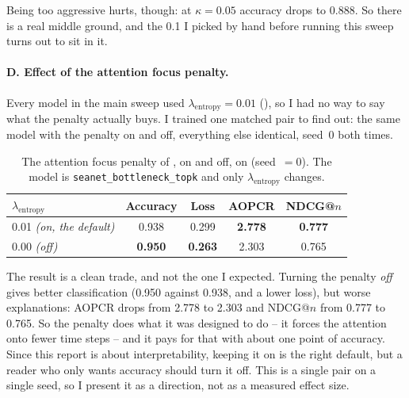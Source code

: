 Being too aggressive hurts, though: at $\kappa = 0.05$ accuracy drops to 0.888. So there is a real
middle ground, and the 0.1 I picked by hand before running this sweep turns out to sit in it.

\paragraph{D. Effect of the attention focus penalty.}
Every model in the main sweep used $\lambda_{\text{entropy}} = 0.01$ (), so I had no
way to say what the penalty actually buys. I trained one matched pair to find out: the same model
with the penalty on and off, everything else identical, seed~0 both times.

\begin{table}[htbp]
\caption{The attention focus penalty of , on and off, on \webtraffic{} (seed~$=0$).
The model is \texttt{seanet\_bottleneck\_topk} and only $\lambda_{\text{entropy}}$ changes.}
\label{tab:ablation_focus}
\begin{center}
\small
\begin{tabular}{lcccc}
\toprule
\textbf{$\lambda_{\text{entropy}}$} & \textbf{Accuracy} & \textbf{Loss} & \textbf{AOPCR} & \textbf{NDCG@$n$} \\
\midrule
0.01 \emph{(on, the default)} & 0.938 & 0.299 & \textbf{2.778} & \textbf{0.777} \\
0.00 \emph{(off)}             & \textbf{0.950} & \textbf{0.263} & 2.303 & 0.765 \\
\bottomrule
\end{tabular}
\end{center}
\end{table}

The result is a clean trade, and not the one I expected. Turning the penalty \emph{off} gives
better classification (0.950 against 0.938, and a lower loss), but worse explanations: AOPCR drops
from 2.778 to 2.303 and NDCG@$n$ from 0.777 to 0.765. So the penalty does what it was designed to
do -- it forces the attention onto fewer time steps -- and it pays for that with about one point of
accuracy. Since this report is about interpretability, keeping it on is the right default, but a
reader who only wants accuracy should turn it off. This is a single pair on a single seed, so I
present it as a direction, not as a measured effect size.

